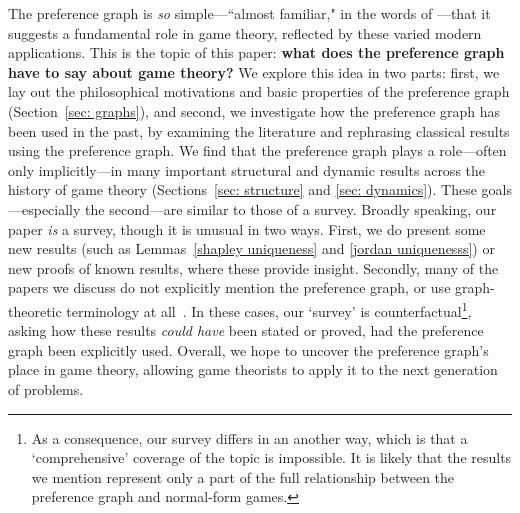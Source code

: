 \documentclass[preprint,authoryear]{elsarticle}
\begin{document}
The preference graph is \emph{so} simple---``almost familiar," in the words of \citeauthor{papadimitriou_game_2019}---that it suggests a fundamental role in game theory, reflected by these varied modern applications. This is the topic of this paper: \textbf{what does the preference graph have to say about game theory?} We explore this idea in two parts: first, we lay out the philosophical motivations and basic properties of the preference graph (Section~\ref{sec: graphs}), and second, we investigate how the preference graph has been used in the past, by examining the literature and rephrasing classical results using the preference graph. We find that the preference graph plays a role---often only implicitly---in many important structural and dynamic results across the history of game theory (Sections~\ref{sec: structure} and \ref{sec: dynamics}). %
These goals---especially the second---are similar to those of a survey. Broadly speaking, our paper \emph{is} a survey, though it is unusual in two ways. First, we do present some new results (such as Lemmas~\ref{shapley uniqueness} and \ref{jordan uniquenesss}) or new proofs of known results, where these provide insight. Secondly, many of the papers we discuss do not explicitly mention the preference graph, or use graph-theoretic terminology at all~\citep[for instance][]{shapley_topics_1964,milgrom_rationalizability_1990,monderer_fictitious_1997,monderer_potential_1996,krishna_convergence_1998}. In these cases, our `survey' is counterfactual\footnote{As a consequence, our survey differs in an another way, which is that a `comprehensive' coverage of the topic is impossible. It is likely that the results we mention represent only a part of the full relationship between the preference graph and normal-form games.}, asking how these results \emph{could have} been stated or proved, had the preference graph been explicitly used. Overall, we hope to uncover the preference graph's place in game theory, allowing game theorists to apply it to the next generation of problems.

\end{document}
